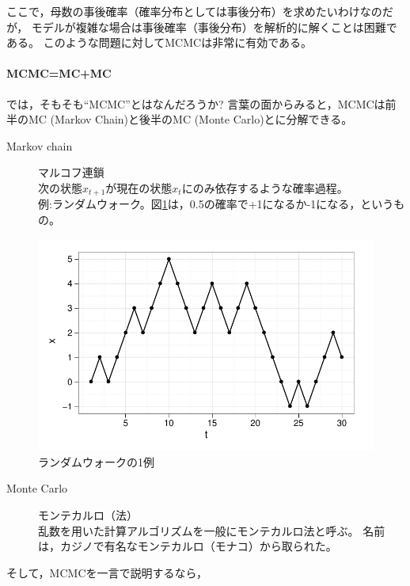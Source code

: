 \documentclass[11pt,uplatex]{jsarticle}
\begin{document}
ここで，母数の事後確率（確率分布としては事後分布）を求めたいわけなのだが，
モデルが複雑な場合は事後確率（事後分布）を解析的に解くことは困難である。
このような問題に対してMCMCは非常に有効である。


\paragraph{MCMC=MC+MC}

では，そもそも``MCMC''とはなんだろうか?
言葉の面からみると，MCMCは前半のMC (Markov Chain)と後半のMC (Monte Carlo)とに分解できる。

\begin{description}
\item[Markov chain] マルコフ連鎖\\
次の状態$x_{t+1}$が現在の状態$x_{t}$にのみ依存するような確率過程。\\
例:ランダムウォーク。図\ref{random_walk_plot}は，0.5の確率で+1になるか-1になる，というもの。
\end{description}

\begin{figure}[hbtp]
  \begin{center}
    \includegraphics[bb=0 0 380 240, clip, width=300 bp]{random_walk2.pdf}
  \end{center}
  \caption{ランダムウォークの1例}
  \label{random_walk_plot}
\end{figure}

\begin{description}
\item[Monte Carlo] モンテカルロ（法）\\
乱数を用いた計算アルゴリズムを一般にモンテカルロ法と呼ぶ。
名前は，カジノで有名なモンテカルロ（モナコ）から取られた。
\end{description}

そして，MCMCを一言で説明するなら，
\end{document}

